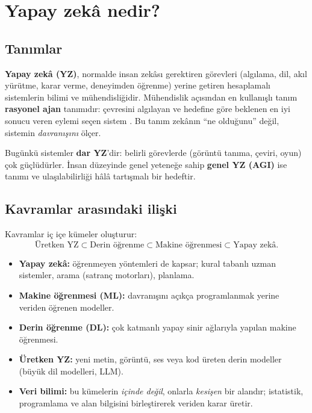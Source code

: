\documentclass[11pt,a4paper]{article}
\begin{document}
\section{Yapay zekâ nedir?}

\subsection{Tanımlar}
\textbf{Yapay zekâ (YZ)}, normalde insan zekâsı gerektiren görevleri (algılama, dil, akıl yürütme, karar verme, deneyimden öğrenme) yerine getiren hesaplamalı sistemlerin bilimi ve mühendisliğidir. Mühendislik açısından en kullanışlı tanım \textbf{rasyonel ajan} tanımıdır: çevresini algılayan ve hedefine göre beklenen en iyi sonucu veren eylemi seçen sistem \cite{aima}. Bu tanım zekânın ``ne olduğunu'' değil, sistemin \emph{davranışını} ölçer.

Bugünkü sistemler \textbf{dar YZ}'dir: belirli görevlerde (görüntü tanıma, çeviri, oyun) çok güçlüdürler. İnsan düzeyinde genel yeteneğe sahip \textbf{genel YZ (AGI)} ise tanımı ve ulaşılabilirliği hâlâ tartışmalı bir hedeftir.

\subsection{Kavramlar arasındaki ilişki}
Kavramlar iç içe kümeler oluşturur:
\[
\text{Üretken YZ} \subset \text{Derin öğrenme} \subset \text{Makine öğrenmesi} \subset \text{Yapay zekâ}.
\]
\begin{itemize}
  \item \textbf{Yapay zekâ:} öğrenmeyen yöntemleri de kapsar; kural tabanlı uzman sistemler, arama (satranç motorları), planlama.
  \item \textbf{Makine öğrenmesi (ML):} davranışını açıkça programlanmak yerine veriden öğrenen modeller.
  \item \textbf{Derin öğrenme (DL):} çok katmanlı yapay sinir ağlarıyla yapılan makine öğrenmesi.
  \item \textbf{Üretken YZ:} yeni metin, görüntü, ses veya kod üreten derin modeller (büyük dil modelleri, LLM).
  \item \textbf{Veri bilimi:} bu kümelerin \emph{içinde değil}, onlarla \emph{kesişen} bir alandır; istatistik, programlama ve alan bilgisini birleştirerek veriden karar üretir.
\end{itemize}
\end{document}
